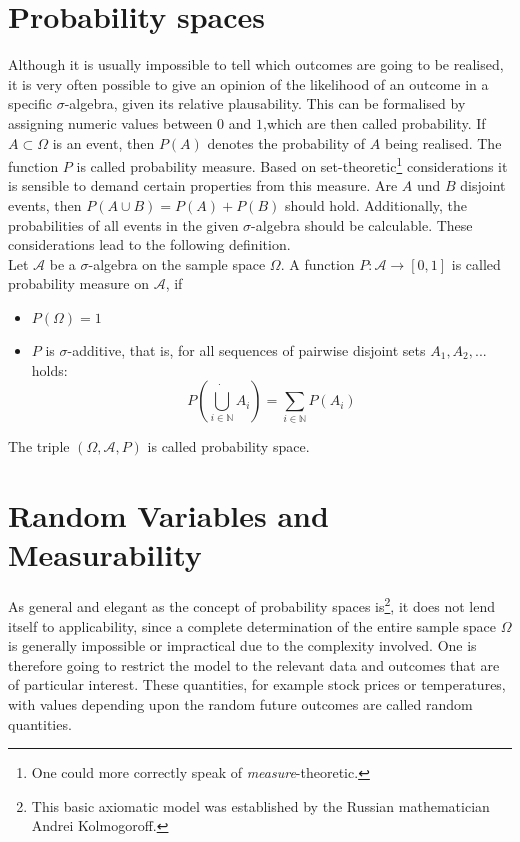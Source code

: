 \documentclass[12pt]{article}
\begin{document}
\section{Probability spaces}
Although it is usually impossible to tell which outcomes are going to be realised, it is very often possible to give an opinion of the likelihood of an outcome in a specific
$\sigma$-algebra, given its relative plausability. This can be formalised by assigning numeric values between $0$ and $1$,which are then called probability. If
$A \subset \Omega$ is an event, then $P(A)$ denotes the probability of $A$ being realised. The function $P$ is called probability measure. Based on set-theoretic\footnote{One could more correctly speak of \textit{measure}-theoretic.} considerations it is sensible to demand certain properties from this measure. Are $A$ und $B$ disjoint events, then
$P(A \cup B) = P(A)+P(B)$ should hold. Additionally, the probabilities of all events in the given $\sigma$-algebra should be calculable. These considerations lead to the following definition.\\

Let $\mathscr{A}$ be a $\sigma$-algebra on the sample space $\Omega$. A function $P : \mathscr{A} \to [0, 1]$ is called probability measure
on $\mathscr{A}$, if
\begin{itemize}
\item{$P(\Omega) = 1$}
\item{$P$ is $\sigma$-additive, that is, for all sequences of pairwise disjoint sets $A_1, A_2, . . .$ holds: \[
P\left( \dot{\bigcup\limits_{i \in \mathbb{N}}}A_i \right) = \sum_{i \in \mathbb{N}}P(A_i)
\]}
\end{itemize}
The triple $(\Omega, \mathscr{A}, P)$ is called probability space.

\section{Random Variables and Measurability}
As general and elegant as the concept of probability spaces is\footnote{This basic axiomatic model was established by the Russian mathematician Andrei Kolmogoroff.}, it does not lend itself to applicability, since a complete determination of the entire sample space $\Omega$
is generally impossible or impractical due to the complexity involved. One is therefore going to restrict the model to the relevant data and outcomes that are of particular interest.
These quantities, for example stock prices or temperatures, with values depending upon the random future outcomes are called random quantities.
\end{document}
